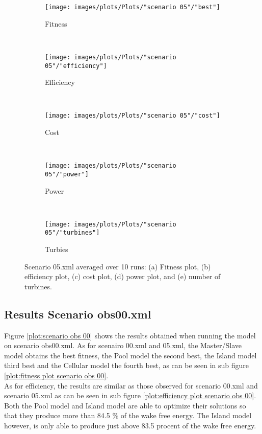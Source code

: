 \begin{figure}[h!]
    \centering
      \begin{subfigure}[b]{0.31\textwidth}
        \texttt{[image: images/plots/Plots/"scenario 05"/"best"]}
        \caption{Fitness}
        \hfill
        \label{plot:fitness plot scenario 05}
    \end{subfigure}
    ~
      \begin{subfigure}[b]{0.31\textwidth}
        \texttt{[image: images/plots/Plots/"scenario 05"/"efficiency"]}
        \caption{Efficiency}
        \hfill
        \label{plot:efficiency plot scenario 05}
    \end{subfigure}
    ~
    \begin{subfigure}[b]{0.31\textwidth}
        \texttt{[image: images/plots/Plots/"scenario 05"/"cost"]}
        \caption{Cost}
        \hfill
        \label{plot:cost plot scenario 05}
    \end{subfigure}
    ~
    \begin{subfigure}[b]{0.31\textwidth}
        \texttt{[image: images/plots/Plots/"scenario 05"/"power"]}
        \caption{Power}
        \hfill
        \label{plot:power plot scenario 05}
    \end{subfigure}
    ~
    \begin{subfigure}[b]{0.31\textwidth}
        \texttt{[image: images/plots/Plots/"scenario 05"/"turbines"]}
        \caption{Turbies}
        \hfill
        \label{plot:turbines plot scenario 05}
    \end{subfigure}
    \caption{Scenario 05.xml averaged over 10 runs: (a) Fitness plot, (b) efficiency plot, (c) cost plot, (d) power plot, and (e) number of turbines.}
    \label{plot:scenario 05}
\end{figure}


\subsection{Results Scenario obs00.xml}
Figure \ref{plot:scenario obs 00} shows the results obtained when running the model on scenario obs00.xml. As for scenairo 00.xml and 05.xml, the Master/Slave model obtains the best fitness, the Pool model the second best, the Island model third best and the Cellular model the fourth best, as can be seen in sub figure \ref{plot:fitness plot scenario obs 00}.\\


\noindent As for efficiency, the results are similar as those observed for scenario 00.xml and scenario 05.xml as can be seen in sub figure \ref{plot:efficiency plot scenario obs 00}. Both the Pool model and Island model are able to optimize their solutions so that they produce more than 84.5 \% of the wake free energy. The Island model however, is only able to produce just above 83.5 procent of the wake free energy.\\


